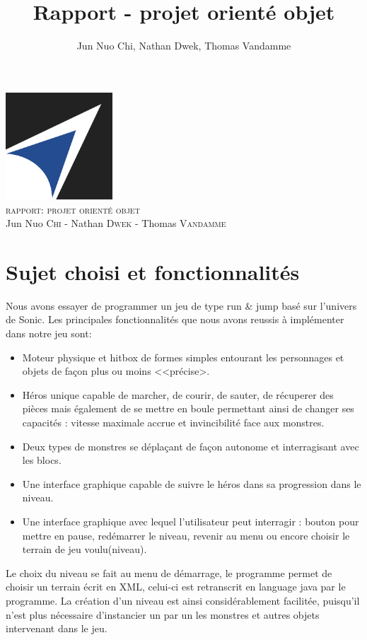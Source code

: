 \documentclass[a4paper, 12pt]{article}
\title{Rapport - projet orienté objet}
\author{Jun Nuo Chi, Nathan Dwek, Thomas Vandamme}
\begin{document}
\begin{center}
  \includegraphics[width=0.3\textwidth]{EPB.jpg}~\\[.5cm]

\textsc{\Large rapport: projet orienté objet}\\
Jun Nuo \textsc{Chi} - Nathan \textsc{Dwek} - Thomas \textsc{Vandamme}
\end{center}

\section{Sujet choisi et fonctionnalités}

Nous avons essayer de programmer un jeu de type run \& jump basé sur l'univers de Sonic. Les principales fonctionnalités que nous avons reussis à implémenter dans notre jeu sont:
\begin{itemize}

\item Moteur physique et hitbox de formes simples entourant les personnages et objets de façon plus ou moins <<précise>.
\item Héros unique capable de marcher, de courir, de sauter, de récuperer des pièces mais également de se mettre en boule permettant ainsi de changer ses capacités : vitesse maximale accrue et invincibilité face aux monstres. 
\item Deux types de monstres se déplaçant de façon autonome et interragisant avec les blocs. 
\item Une interface graphique capable de suivre le héros dans sa progression dans le niveau.
\item Une interface graphique avec lequel l'utilisateur peut interragir : bouton pour mettre en pause, redémarrer le niveau, revenir au menu ou encore choisir le terrain de jeu voulu(niveau).

\end{itemize}

Le choix du niveau se fait au menu de démarrage, le programme permet de choisir un terrain écrit en XML, celui-ci est retranscrit en language java par le programme. La création d'un  niveau est ainsi considérablement facilitée, puisqu'il n'est plus nécessaire d'instancier un par un les monstres et autres objets intervenant dans le jeu.
\end{document}
